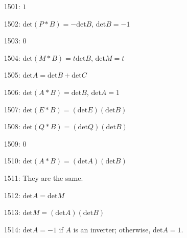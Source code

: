 \documentclass{article}
\begin{document}
\begin{enumerate}
  \item[1501:] $1$
  \item[1502:] $\text{det}(P*B) = -\text{det}B$, $\text{det}B = -1$
  \item[1503:] $0$
  \item[1504:] $\text{det}(M*B) = t \text{det}B$, $\text{det}M = t$
  \item[1505:] $\text{det}A = \text{det}B + \text{det}C$
  \item[1506:] $\text{det}(A*B) = \text{det}B$, $\text{det}A = 1$
  \item[1507:] $\text{det}(E*B) = (\text{det}E) (\text{det}B)$
  \item[1508:] $\text{det}(Q*B) = (\text{det}Q) (\text{det}B)$
  \item[1509:] $0$
  \item[1510:] $\text{det}(A*B) = (\text{det}A) (\text{det}B)$
  \item[1511:] They are the same.
  \item[1512:] $\text{det}A = \text{det}M$
  \item[1513:] $\text{det}M = (\text{det}A) (\text{det}B)$
  \item[1514:] $\text{det}A = -1$ if $A$ is an inverter; otherwise, $\text{det}A = 1$.
\end{enumerate}
\end{document}
